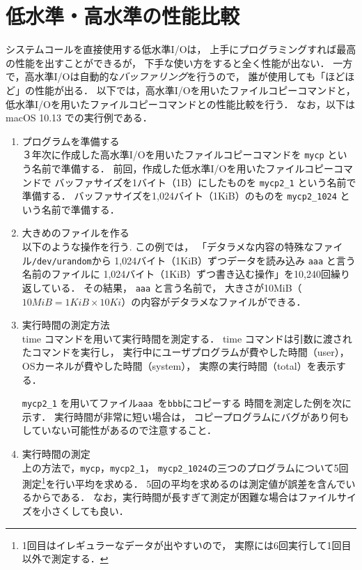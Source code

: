 \section{低水準・高水準の性能比較}
システムコールを直接使用する低水準I/Oは，
上手にプログラミングすれば最高の性能を出すことができるが，
下手な使い方をすると全く性能が出ない．
一方で，高水準I/Oは自動的な\emph{バッファリング}を行うので，
誰が使用しても「ほどほど」の性能が出る．
以下では，高水準I/Oを用いたファイルコピーコマンドと，
低水準I/Oを用いたファイルコピーコマンドとの性能比較を行う．
なお，以下は macOS 10.13 での実行例である．

\begin{enumerate}
\item プログラムを準備する  \\
３年次に作成した高水準I/Oを用いたファイルコピーコマンドを
\texttt{mycp} という名前で準備する．
前回，作成した低水準I/Oを用いたファイルコピーコマンドで
バッファサイズを1バイト（1B）にしたものを
\texttt{mycp2\_1} という名前で準備する．
バッファサイズを1,024バイト（1KiB）のものを
\texttt{mycp2\_1024} という名前で準備する．

\item 大きめのファイルを作る \\
以下のような操作を行う.
この例では，
「デタラメな内容の特殊なファイル\texttt{/dev/urandom}から
1,024バイト（1KiB）ずつデータを読み込み
\texttt{aaa} と言う名前のファイルに
1,024バイト（1KiB）ずつ書き込む操作」を10,240回繰り返している．
その結果， \texttt{aaa} と言う名前で，
大きさが10MiB（$10MiB = 1KiB \times 10Ki$）の内容がデタラメなファイルができる．



\item 実行時間の測定方法 \\
time コマンドを用いて実行時間を測定する．
time コマンドは引数に渡されたコマンドを実行し，
実行中にユーザプログラムが費やした時間（user），
OSカーネルが費やした時間（system），
実際の実行時間（total）を表示する．

\texttt{mycp2\_1} を用いてファイル\texttt{aaa }を\texttt{bbb}にコピーする
時間を測定した例を次に示す．
実行時間が非常に短い場合は，
コピープログラムにバグがあり何もしていない可能性があるので注意すること．



\item 実行時間の測定 \\
上の方法で，\texttt{mycp}，\texttt{mycp2\_1}，
\texttt{mycp2\_1024}の三つのプログラムについて5回測定\footnote{
1回目はイレギュラーなデータが出やすいので，
実際には6回実行して1回目以外で測定する．
}を行い平均を求める．
5回の平均を求めるのは測定値が誤差を含んでいるからである．
なお，実行時間が長すぎて測定が困難な場合はファイルサイズを小さくしても良い．
\end{enumerate}

